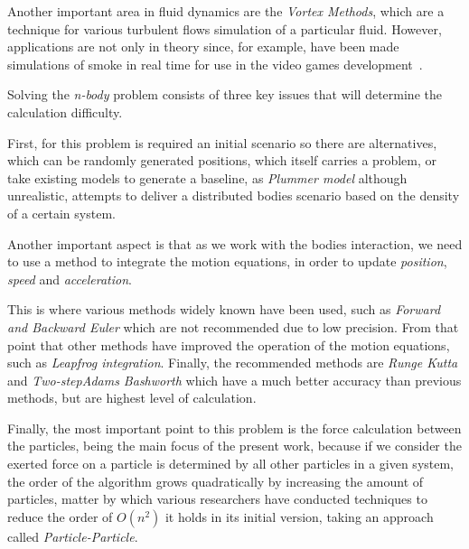 Another important area in fluid dynamics are the \emph{Vortex Methods},
which are a technique for various turbulent flows simulation of a particular fluid.
However, applications are not only in theory since, for example,
have been made simulations of smoke in real time for use in the video games development~\cite{Gourlay}.


Solving the \emph{n-body} problem consists of three
key issues that will determine the calculation difficulty.

First, for this problem is required an initial scenario
so there are alternatives, which can be
randomly generated positions, which itself carries a problem,
or take existing models to generate a baseline,
as \emph{Plummer model} although unrealistic,
attempts to deliver a distributed bodies scenario
based on the density of a certain system.

Another important aspect is that as we work with the bodies interaction,
we need to use a method to integrate the motion equations,
in order to update \emph{position}, \emph{speed}
and \emph{acceleration}.

This is where various methods widely known have been used,
such as \emph{Forward and Backward Euler} which are not recommended
due to low precision. From that point that other methods have improved
the operation of the motion equations, such as \emph{Leapfrog integration}.
Finally, the recommended methods are \emph{Runge Kutta} and \emph{Two-stepAdams Bashworth}
which have a much better accuracy than previous methods, but are
highest level of calculation.

Finally, the most important point to this problem is the force calculation between the particles,
being the main focus of the present work, because if we consider the exerted force on a particle
is determined by all other particles in a given system, the order of the algorithm grows
quadratically by increasing the amount of particles, matter by which various researchers have
conducted techniques to reduce the order of $O(n^2)$ it holds in its initial version,
taking an approach called \emph{Particle-Particle}.







